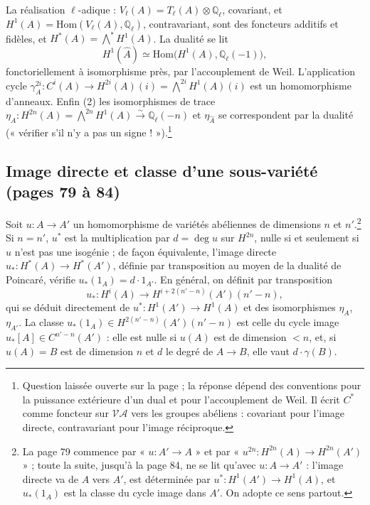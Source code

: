 \documentclass[11pt,a4paper]{article}
\begin{document}
La réalisation $\ell$-adique : $V_{\ell}(A) = T_{\ell}(A) \otimes \mathbb{Q}_{\ell}$,
covariant, et $H^{1}(A) = \mathrm{Hom}(V_{\ell}(A), \mathbb{Q}_{\ell})$,
contravariant, sont des foncteurs additifs et fidèles, et $H^{*}(A) =
\bigwedge^{*}H^{1}(A)$. La dualité se lit
\[
H^{1}(\hat{A}) \simeq \mathrm{Hom}\bigl(H^{1}(A), \mathbb{Q}_{\ell}(-1)\bigr) ,
\]
fonctoriellement à isomorphisme près, par l'accouplement de Weil. L'application
cycle $\gamma^{2i}_{A} \colon C^{i}(A) \to H^{2i}(A)(i) = \bigwedge^{2i}H^{1}(A)(i)$
est un homomorphisme d'anneaux. Enfin (2) les isomorphismes de trace $\eta_{A}
\colon H^{2n}(A) = \bigwedge^{2n}H^{1}(A) \xrightarrow{\sim} \mathbb{Q}_{\ell}(-n)$ et
$\eta_{\hat{A}}$ se correspondent par la dualité (« vérifier s'il n'y a pas
un signe ! »).\footnote{Question laissée ouverte sur la page ; la réponse dépend
des conventions pour la puissance extérieure d'un dual et pour l'accouplement de
Weil. Il écrit $C^{*}$ comme foncteur sur $\mathcal{VA}$ vers les groupes
abéliens : covariant pour l'image directe, contravariant pour l'image
réciproque.}

\subsection*{Image directe et classe d'une sous-variété (pages 79 à 84)}

Soit $u \colon A \to A'$ un homomorphisme de variétés abéliennes de dimensions
$n$ et $n'$.\footnote{La page 79 commence par « $u \colon A' \to A$ » et par
« $u^{2n} \colon H^{2n}(A) \to H^{2n}(A')$ » ; toute la suite, jusqu'à la page 84,
ne se lit qu'avec $u \colon A \to A'$ : l'image directe va de $A$ vers $A'$,
est déterminée par $u^{*} \colon H^{1}(A') \to H^{1}(A)$, et $u_{*}(1_{A})$ est
la classe du cycle image dans $A'$. On adopte ce sens partout.} Si $n = n'$,
$u^{*}$ est la multiplication par $d = \deg u$ sur $H^{2n}$, nulle si et
seulement si $u$ n'est pas une isogénie ; de façon équivalente, l'image directe
$u_{*} \colon H^{*}(A) \to H^{*}(A')$, définie par transposition au moyen de la
dualité de Poincaré, vérifie $u_{*}(1_{A}) = d\cdot 1_{A'}$. En général, on
définit par transposition
\[
u_{*} \colon H^{i}(A) \longrightarrow H^{i+2(n'-n)}(A')(n'-n) ,
\]
qui se déduit directement de $u^{*} \colon H^{1}(A') \to H^{1}(A)$ et des
isomorphismes $\eta_{A}$, $\eta_{A'}$. La classe $u_{*}(1_{A}) \in
H^{2(n'-n)}(A')(n'-n)$ est celle du cycle image $u_{*}[A] \in C^{n'-n}(A')$ :
elle est nulle si $u(A)$ est de dimension $< n$, et, si $u(A) = B$ est de
dimension $n$ et $d$ le degré de $A \to B$, elle vaut $d\cdot\gamma(B)$.
\end{document}

